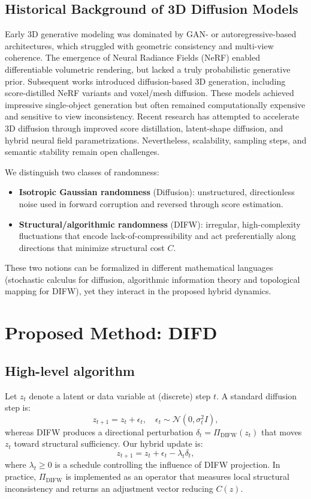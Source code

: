 \documentclass[11pt]{article}
\begin{document}
\subsection{Historical Background of 3D Diffusion Models}
Early 3D generative modeling was dominated by GAN- or autoregressive-based architectures,
which struggled with geometric consistency and multi-view coherence. The emergence of Neural
Radiance Fields (NeRF) enabled differentiable volumetric rendering, but lacked a truly
probabilistic generative prior. Subsequent works introduced diffusion-based 3D generation,
including score-distilled NeRF variants and voxel/mesh diffusion. These models achieved
impressive single-object generation but often remained computationally expensive and sensitive
to view inconsistency. Recent research has attempted to accelerate 3D diffusion through
improved score distillation, latent-shape diffusion, and hybrid neural field parametrizations.
Nevertheless, scalability, sampling steps, and semantic stability remain open challenges.

We distinguish two classes of randomness:
\begin{itemize}
  \item \textbf{Isotropic Gaussian randomness} (Diffusion): unstructured, directionless noise used
  in forward corruption and reversed through score estimation.
  \item \textbf{Structural/algorithmic randomness} (DIFW): irregular, high-complexity fluctuations
  that encode lack-of-compressibility and act preferentially along directions that minimize
  structural cost $C$.
\end{itemize}
These two notions can be formalized in different mathematical languages (stochastic calculus
for diffusion, algorithmic information theory and topological mapping for DIFW), yet they
interact in the proposed hybrid dynamics.

\section{Proposed Method: DIFD}
\subsection{High-level algorithm}
Let $z_t$ denote a latent or data variable at (discrete) step $t$. A standard diffusion step is:
\begin{equation}
z_{t+1} = z_t + \epsilon_t, \quad \epsilon_t \sim \mathcal{N}(0, \sigma_t^2 I),
\end{equation}
whereas DIFW produces a directional perturbation $\delta_t = \Pi_{\mathrm{DIFW}}(z_t)$ that
moves $z_t$ toward structural sufficiency. Our hybrid update is:
\begin{equation}\label{eq:hybrid}
z_{t+1} = z_t + \epsilon_t - \lambda_t \delta_t,
\end{equation}
where $\lambda_t\ge 0$ is a schedule controlling the influence of DIFW projection. In practice,
$\Pi_{\mathrm{DIFW}}$ is implemented as an operator that measures local structural inconsistency
and returns an adjustment vector reducing $C(z)$.
\end{document}
